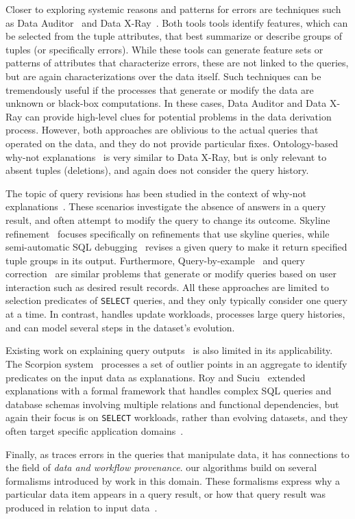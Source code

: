 Closer to exploring systemic reasons and patterns for errors are
techniques such as Data Auditor~\cite{GolabKKS10, Golab2008
} and Data
X-Ray~\cite{wang2015}. Both tools tools identify features, which can
be selected from the tuple attributes, that best summarize or describe
groups of tuples (or specifically errors). While these tools can
generate feature sets or patterns of attributes that characterize
errors, these are not linked to the queries, but are again
characterizations over the data itself. Such techniques can be
tremendously useful if the processes that generate or modify the data
are unknown or black-box computations. In these cases, Data Auditor
and Data X-Ray can provide high-level clues for potential problems in
the data derivation process. However, both approaches are oblivious to
the actual queries that operated on the data, and they do not provide
particular fixes. Ontology-based why-not
explanations~\cite{tenCate2015} is very similar to Data X-Ray, but is
only relevant to absent tuples (deletions), and again does not
consider the query history.

The topic of query revisions has been studied in the context of
why-not explanations~\cite{Chapman2009}. These scenarios investigate
the absence of answers in a query result, and often attempt to modify
the query to change its outcome. Skyline
refinement~\cite{tran2010conquer} focuses specifically on refinements
that use skyline queries, while semi-automatic SQL
debugging~\cite{tzompanaki14semi} revises a given query to make it
return specified tuple groups in its output.  Furthermore, Query-by-example~\cite{zloof1977query} 
and query correction~\cite{abouzied2012dataplay} are similar problems that generate or modify
queries based on user interaction such as desired result records.
All these approaches are
limited to selection predicates of \texttt{SELECT} queries, and they
only typically consider one query at a time. In contrast, \sys handles
update workloads, processes large query histories, and can model
several steps in the dataset's evolution.

Existing work on explaining query outputs~\cite{GebalyAGKS14} is also
limited in its applicability. The Scorpion system~\cite{Wu13}
processes a set of outlier points in an aggregate to identify
predicates on the input data as explanations. Roy and
Suciu~\cite{Roy2014} extended explanations with a formal framework
that handles complex SQL queries and database schemas involving
multiple relations and functional dependencies, but again their focus
is on \texttt{SELECT} workloads, rather than evolving datasets, and
they often target specific application domains~\cite{Khoussainova2012, Thirumuruganathan2012, Das2011, Fabbri2011, Bender14
}.

Finally, as \sys traces errors in the queries that manipulate data, it
has connections to the field of \emph{data and workflow provenance}.
our algorithms build on several formalisms introduced by work in this
domain. These formalisms express why a particular data item appears in
a query result, or how that query result was produced in relation to
input data~\cite{BunemanKT01,GKT07-semirings, CheneyCT09, CuiWW00
}.


